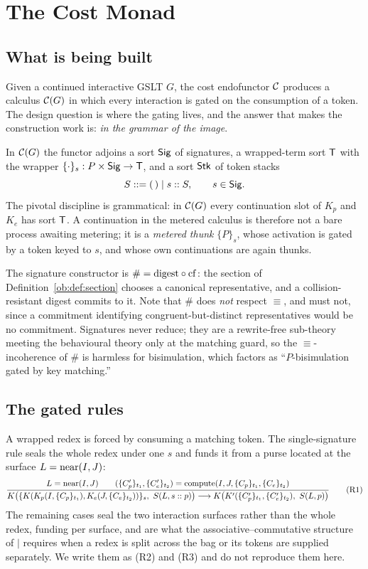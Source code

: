 \chapter{The Cost Monad}
\label{ch:costmonad}

\section{What is being built}

Given a continued interactive GSLT $G$, the cost endofunctor $\mathcal{C}$ produces a calculus
$\mathcal{C}(G)$ in which every interaction is gated on the consumption of a token. The design
question is where the gating lives, and the answer that makes the construction work is:
\emph{in the grammar of the image}.

In $\mathcal{C}(G)$ the functor adjoins a sort $\mathsf{Sig}$ of signatures, a wrapped-term sort $\mathsf{T}$
with the wrapper $\{\cdot\}_s : P \times \mathsf{Sig} \to \mathsf{T}$, and a sort $\mathsf{Stk}$ of token stacks
\[
  S ::= (\,) \mid s :: S, \qquad s \in \mathsf{Sig} .
\]
The pivotal discipline is grammatical: in $\mathcal{C}(G)$ every continuation slot of $K_p$ and
$K_e$ has sort $\mathsf{T}$. A continuation in the metered calculus is therefore not a bare
process awaiting metering; it is a \emph{metered thunk} $\{P\}_s$, whose activation is
gated by a token keyed to $s$, and whose own continuations are again thunks.

The signature constructor is $\# = \mathrm{digest} \circ \mathrm{cf}$: the section of
Definition~\ref{ob:def:section} chooses a canonical representative, and a collision-resistant
digest commits to it. Note that $\#$ does \emph{not} respect $\equiv$, and must not,
since a commitment identifying congruent-but-distinct representatives would be no
commitment. Signatures never reduce; they are a rewrite-free sub-theory meeting the
behavioural theory only at the matching guard, so the $\equiv$-incoherence of $\#$ is
harmless for bisimulation, which factors as ``$P$-bisimulation gated by key matching.''

\section{The gated rules}

A wrapped redex is forced by consuming a matching token. The single-signature rule seals
the whole redex under one $s$ and funds it from a purse located at the surface
$L = \mathrm{near}(I,J)$:
\[
  \frac{L = \near(I,J) \qquad
        (\{C_p'\}_{t_1}, \{C_e'\}_{t_2}) = \compute(I,J,\{C_p\}_{t_1},\{C_e\}_{t_2})}
       {K\bigl(\{K(K_p(I,\{C_p\}_{t_1}), K_e(J,\{C_e\}_{t_2}))\}_s,\ S(L, s::p)\bigr)
        \longrightarrow
        K\bigl(K'(\{C_p'\}_{t_1}, \{C_e'\}_{t_2}),\ S(L,p)\bigr)}
  \tag{R1}
\]
The remaining cases seal the two interaction surfaces rather than the whole redex,
funding per surface, and are what the associative--commutative structure of $\mid$
requires when a redex is split across the bag or its tokens are supplied separately. We
write them as (R2) and (R3) and do not reproduce them here.

